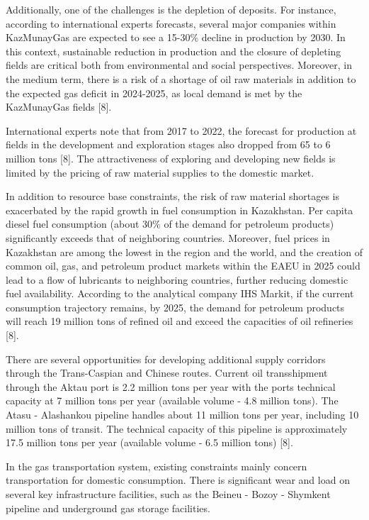 \begin{multicols}{2}
Additionally, one of the challenges is the depletion of deposits. For
instance, according to international experts\textquotesingle{}
forecasts, several major companies within KazMunayGas are expected to
see a 15-30\% decline in production by 2030. In this context,
sustainable reduction in production and the closure of depleting fields
are critical both from environmental and social perspectives. Moreover,
in the medium term, there is a risk of a shortage of oil raw materials
in addition to the expected gas deficit in 2024-2025, as local demand is
met by the KazMunayGas fields {[}8{]}.

International experts note that from 2017 to 2022, the forecast for
production at fields in the development and exploration stages also
dropped from 65 to 6 million tons {[}8{]}. The attractiveness of
exploring and developing new fields is limited by the pricing of raw
material supplies to the domestic market.

In addition to resource base constraints, the risk of raw material
shortages is exacerbated by the rapid growth in fuel consumption in
Kazakhstan. Per capita diesel fuel consumption (about 30\% of the demand
for petroleum products) significantly exceeds that of neighboring
countries. Moreover, fuel prices in Kazakhstan are among the lowest in
the region and the world, and the creation of common oil, gas, and
petroleum product markets within the EAEU in 2025 could lead to a flow
of lubricants to neighboring countries, further reducing domestic fuel
availability. According to the analytical company IHS Markit, if the
current consumption trajectory remains, by 2025, the demand for
petroleum products will reach 19 million tons of refined oil and exceed
the capacities of oil refineries {[}8{]}.

There are several opportunities for developing additional supply
corridors through the Trans-Caspian and Chinese routes. Current oil
transshipment through the Aktau port is 2.2 million tons per year with
the port\textquotesingle s technical capacity at 7 million tons per year
(available volume - 4.8 million tons). The Atasu - Alashankou pipeline
handles about 11 million tons per year, including 10 million tons of
transit. The technical capacity of this pipeline is approximately 17.5
million tons per year (available volume - 6.5 million tons) {[}8{]}.

In the gas transportation system, existing constraints mainly concern
transportation for domestic consumption. There is significant wear and
load on several key infrastructure facilities, such as the Beineu -
Bozoy - Shymkent pipeline and underground gas storage facilities.


\end{multicols}
